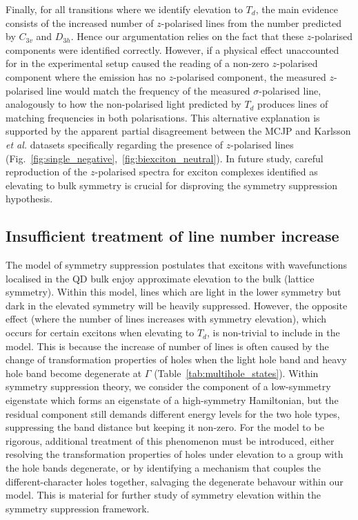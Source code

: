 Finally, for all transitions where we identify elevation to $T_d$, the main evidence consists of the increased number of $z$-polarised lines from the number predicted by $C_{3v}$ and $D_{3h}$. Hence our argumentation relies on the fact that these $z$-polarised components were identified correctly. However, if a physical effect unaccounted for in the experimental setup caused the reading of a non-zero $z$-polarised component where the emission has no $z$-polarised component, the measured $z$-polarised line would match the frequency of the measured $\sigma$-polarised line, analogously to how the non-polarised light predicted by $T_d$ produces lines of matching frequencies in both polarisations. This alternative explanation is supported by the apparent partial disagreement between the MCJP and Karlsson \textit{et al.} datasets specifically regarding the presence of $z$-polarised lines (Fig.~\ref{fig:single_negative},~\ref{fig:biexciton_neutral}). In future study, careful reproduction of the $z$-polarised spectra for exciton complexes identified as elevating to bulk symmetry is crucial for disproving the symmetry suppression hypothesis.

\subsection{Insufficient treatment of line number increase} \label{sec:failed_degeneracy}
The model of symmetry suppression postulates that excitons with wavefunctions localised in the QD bulk enjoy approximate elevation to the bulk (lattice symmetry). Within this model, lines which are light in the lower symmetry but dark in the elevated symmetry will be heavily suppressed. However, the opposite effect (where the number of lines increases with symmetry elevation), which occurs for certain excitons when elevating to $T_d$, is non-trivial to include in the model. This is because the increase of number of lines is often caused by the change of transformation properties of holes when the light hole band and heavy hole band become degenerate at $\Gamma$ (Table~\ref{tab:multihole_states}). Within symmetry suppression theory, we consider the component of a low-symmetry eigenstate which forms an eigenstate of a high-symmetry Hamiltonian, but the residual component still demands different energy levels for the two hole types, suppressing the band distance but keeping it non-zero. For the model to be rigorous, additional treatment of this phenomenon must be introduced, either resolving the transformation properties of holes  under elevation to a group with the hole bands degenerate, or by identifying a mechanism that couples the different-character holes together, salvaging the degenerate behavour within our model. This is material for further study of symmetry elevation within the symmetry suppression framework.

